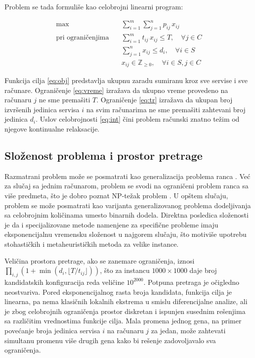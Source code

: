 \documentclass[12pt]{article}
\begin{document}
Problem se tada formuliše kao celobrojni linearni program:

\begin{align}
    \max \quad & \sum_{i=1}^{m}\sum_{j=1}^{n} p_{ij} \, x_{ij} \label{eq:obj}\\
    \text{pri ograničenjima} \quad & \sum_{i=1}^{m} t_{ij} \, x_{ij} \leq T, \quad \forall j \in C \label{eq:vreme}\\
    & \sum_{j=1}^{n} x_{ij} \leq d_i, \quad \forall i \in S \label{eq:tr}\\
    & x_{ij} \in \mathbb{Z}_{\geq 0}, \quad \forall i \in S, j \in C \label{eq:int}
\end{align}

Funkcija cilja \eqref{eq:obj} predstavlja ukupnu zaradu sumiranu kroz sve servise i sve računare. Ograničenje \eqref{eq:vreme} izražava da ukupno vreme provedeno na računaru $j$ ne sme premašiti $T$. Ograničenje \eqref{eq:tr} izražava da ukupan broj izvršenih jedinica servisa $i$ na svim računarima ne sme premašiti zahtevani broj jedinica $d_i$. Uslov celobrojnosti \eqref{eq:int} čini problem računski znatno težim od njegove kontinualne relaksacije.

\subsection{Složenost problema i prostor pretrage}

Razmatrani problem može se posmatrati kao generalizacija problema ranca \cite{MartelloToth1990}. Već za slučaj sa jednim računarom, problem se svodi na ograničeni problem ranca sa više predmeta, što je dobro poznat NP-težak problem \cite{Sipser2012}. U opštem slučaju, problem se može posmatrati kao varijanta generalizovanog problema dodeljivanja \cite{FisherJaikumar1981, ChuBeasley1997} sa celobrojnim količinama umesto binarnih dodela. Direktna posledica složenosti je da i specijalizovane metode namenjene za specifične probleme imaju eksponencijalnu vremensku složenost u najgorem slučaju, što motiviše upotrebu stohastičkih i metaheurističkih metoda za velike instance.

Veličina prostora pretrage, ako se zanemare ograničenja, iznosi $\prod_{i,j} (1 + \min(d_i, \lfloor T/t_{ij} \rfloor))$, što za instancu $1000 \times 1000$ daje broj kandidatskih konfiguracija reda veličine $10^{2000}$. Potpuna pretraga je očigledno neostvariva. Pored eksponencijalnog rasta broja kandidata, funkcija cilja je linearna, pa nema klasičnih lokalnih ekstrema u smislu diferencijalne analize, ali je zbog celobrojnih ograničenja prostor diskretan i ispunjen susednim rešenjima sa različitim vrednostima funkcije cilja. Mala promena jednog gena, na primer povećanje broja jedinica servisa $i$ na računaru $j$ za jedan, može zahtevati simultanu promenu više drugih gena kako bi rešenje zadovoljavalo sva ograničenja.
\end{document}
